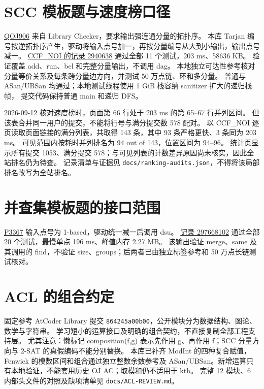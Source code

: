 \section{SCC 模板题与速度榜口径}\label{knowledge-scc-template}
\href{https://qoj.ac/problem/906}{QOJ906} 来自 Library Checker，要求输出强连通分量的拓扑序。
本库 Tarjan 编号按逆拓扑序产生，驱动将输入点号加一，再按分量编号从大到小输出，输出点号减一。
\href{https://qoj.ac/submission/2940638}{CCF\_NOI 的记录 2940638} 通过全部 11 个测试，203 ms、58636 KB。
验证覆盖 add、run、bel 和完整分量输出，不调用 dag。
本地独立可达性参考核对分量等价关系及每条跨分量边方向，并测试 50 万点链、环和多分量。
普通与 ASan/UBSan 均通过；本地测试线程使用 1 GiB 栈容纳 sanitizer 扩大的递归栈帧，
提交代码保持普通 main 和递归 DFS。

2026-09-12 核对速度榜时，页面第 66 行处于 203 ms 的第 65--67 行并列区间。
但该表合并同一用户的提交，不能将行号与满分提交数 578 配对。
以 CCF\_NOI 逐页读取页面链接的满分列表，共取得 143 条，其中 93 条严格更快、3 条同为 203 ms。
可见范围内按耗时并列排名为 94 out of 143，位置区间为 94--96。
统计页显示所有提交 1053、满分提交 578；与可见列表的计数差异原因尚未核实，因此全站排名仍为待查。
记录清单与证据见 \texttt{docs/ranking-audits.json}，不得将该局部排名改写为全站排名。

\section{并查集模板题的接口范围}\label{knowledge-dsu-template}
\href{https://www.luogu.com.cn/problem/P3367}{P3367} 输入点号为 1-based，驱动统一减一后调用 dsu。
\href{https://www.luogu.com.cn/record/297668102}{记录 297668102} 通过全部 20 个测试，最慢单点 196 ms、峰值内存 2.27 MB。
该输出验证 merge、same 及其调用的 find，不验证 size、groups；后两者已由独立标签参考和 50 万点长链测试核对。

\section{ACL 的组合约定}\label{knowledge-acl-compose}
固定参考 AtCoder Library 提交 \texttt{864245a00b00}，公开模块分为数据结构、图论、数学与字符串。
学习短小的运算接口及明确的组合契约，不直接复制全部工程支持层。
尤其注意：懒标记 composition(f,g) 表示先作用 g、再作用 f；SCC 分量方向与 2-SAT 的真假编码不能分别替换。
本库已补齐 ModInt 的四种复合赋值，Fenwick 的模数区间和组合通过独立整数余数参考及 ASan/UBSan。新增运算只有本地验证，不能套用历史 OJ AC；取模和仍不适用于 kth。
完整 12 模块、6 内部头文件的对照及缺项清单见 \texttt{docs/ACL-REVIEW.md}。

